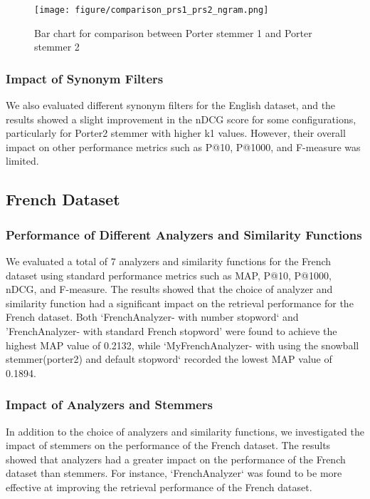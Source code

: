 \begin{figure}
  \centering
  \texttt{[image: figure/comparison\_prs1\_prs2\_ngram.png]}
  \caption{\centering Bar chart for comparison between Porter stemmer 1 and Porter stemmer 2 }
  \label{fig:Porter1&2_stem}
\end{figure}

\subsubsection{Impact of Synonym Filters}

We also evaluated different synonym filters for the English dataset, and the results showed a slight improvement in the nDCG score for some configurations, particularly for Porter2 stemmer with higher k1 values. However, their overall impact on other performance metrics such as P@10, P@1000, and F-measure was limited.

\subsection{French Dataset}

\subsubsection{Performance of Different Analyzers and Similarity Functions}

We evaluated a total of 7 analyzers and similarity functions for the French dataset using standard performance metrics such as MAP, P@10, P@1000, nDCG, and F-measure. The results showed that the choice of analyzer and similarity function had a significant impact on the retrieval performance for the French dataset. Both `FrenchAnalyzer- with number stopword` and 'FrenchAnalyzer- with standard French stopword' were found to achieve the highest MAP value of 0.2132, while `MyFrenchAnalyzer- with using the snowball stemmer(porter2) and default stopword` recorded the lowest MAP value of 0.1894.
 

\subsubsection{Impact of Analyzers and Stemmers}

In addition to the choice of analyzers and similarity functions, we investigated the impact of stemmers on the performance of the French dataset. The results showed that analyzers had a greater impact on the performance of the French dataset than stemmers. For instance, `FrenchAnalyzer` was found to be more effective at improving the retrieval performance of the French dataset.

